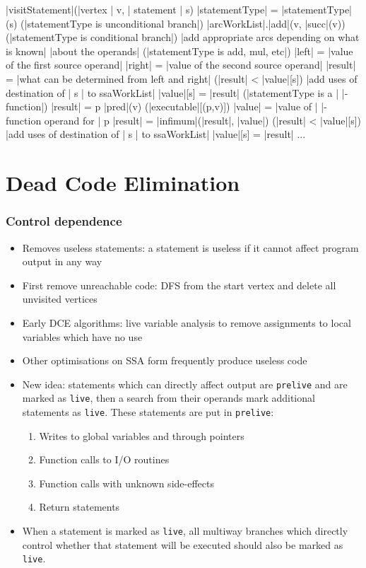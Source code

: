 \documentclass[a4paper,12pt, notitlepage]{article}
\begin{document}
\pagebreak
\begin{program}
\PROC |visitStatement|(|vertex | v, | statement | s) \BODY
    |statementType| = |statementType|(s)
    \IF (|statementType is unconditional branch|) \AR*
        |arcWorkList|.|add|(v, |succ|(v))
    \ELSIF (|statementType is conditional branch|) \AR*
        |add appropriate arcs depending on what is known|
        |about the operands|
    \ELSIF (|statementType is add, mul, etc|) \AR*
        |left| = |value of the first source operand|
        |right| = |value of the second source operand|
        |result| = |what can be determined from left and right|
        \IF (|result| < |value|[s]) \AR*
            |add uses of destination of | s | to ssaWorkList|
            |value|[s] = |result|
        \FI
    \ELSIF (|statementType is a | \phi |-function|) \AR*
        |result| = \top
        \FOREACH p \in |pred|(v) \DO
            \IF (|executable|[(p,v)]) \AR*
                |value| = |value of | \phi|-function operand for | p
                |result| = |infimum|(|result|, |value|)
            \FI
        \OD
        \IF (|result| < |value|[s]) \AR*
            |add uses of destination of | s | to ssaWorkList|
            |value|[s] = |result|
        \FI
    \FI
    ...

\end{program}

\section*{Dead Code Elimination}
\subsubsection*{Control dependence}
\begin{itemize}
\item Removes useless statements: a statement is useless if it cannot affect
program output in any way
\item First remove unreachable code: DFS from the start vertex and delete all
unvisited vertices
\item Early DCE algorithms: live variable analysis to remove assignments to 
local variables which have no use
\item Other optimisations on SSA form frequently produce useless code
\item New idea: statements which can directly affect output are \texttt{prelive}
and are marked as \texttt{live}, then a search from their operands mark
additional statements as \texttt{live}. These statements are put in
\texttt{prelive}:
    \begin{enumerate}
    \item Writes to global variables and through pointers
    \item Function calls to I/O routines
    \item Function calls with unknown side-effects
    \item Return statements
    \end{enumerate}
\item When a statement is marked as \texttt{live}, all multiway branches which
directly control whether that statement will be executed should also be marked
as \texttt{live}.
\end{itemize}
\end{document}
